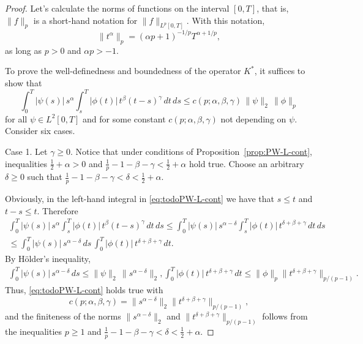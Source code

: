 \documentclass{article}
\theoremstyle{plain}
\theoremstyle{remark}
\theoremstyle{definition}
\begin{document}
\begin{proof} Let's calculate the norms of functions on the interval
	$[0,T]$,  that is, $\|f\|_p$ is a short-hand notation for
	$\|f\|_{L^p[0,T]}$.
	With this notation,
	$$\|t^\alpha\|_p = (\alpha p + 1)^{-1/p}T^{\alpha + 1/p},$$
	as long as $p>0$ and $\alpha p > -1$.

	To prove the well-definedness and boundedness of the operator $K^*$,
	it suffices to show that
	\begin{equation}
		\label{eq:todoPW-L-cont}
		\int_0^T |\psi(s)|\, s^\alpha
		\int_s^T |\phi(t)|\, t^\beta (t-s)^\gamma
		\, dt \, ds \le
		c(p;\alpha,\beta,\gamma) \, \|\psi\|_2 \, \|\phi\|_p
	\end{equation}
	for all $\psi\in L^2[0,T]$ and
	for some   constant  $c(p;\alpha,\beta,\gamma)$ not depending  on
	$\psi$.
Consider six cases.

Case 1. Let $\gamma\ge 0$.
	Notice that under conditions of Proposition~\ref{prop:PW-L-cont},
	inequalities
	$\frac12+\alpha>0$ and $\frac1p - 1 - \beta - \gamma < \frac12+\alpha$
	hold true.
	Choose an arbitrary $\delta\ge 0$ such that
	$\frac1p - 1 - \beta - \gamma < \delta < \frac12+\alpha$.

	Obviously, in the  left-hand integral  in \eqref{eq:todoPW-L-cont} we have that
	$s\mathbin{\le}t$ and $t-s\mathbin{\le} t$.
	Therefore
	\begin{equation*}\begin{gathered}
	    \int_0^T |\psi(s)|\, s^\alpha
		\int_s^T |\phi(t)|\, t^\beta (t-s)^\gamma
		\, dt \, ds
		\le  \int_0^T |\psi(s)|\, s^{\alpha-\delta}
			\int_s^T |\phi(t)|\, t^{\delta+\beta+\gamma}
			\, dt \, ds
			\\ \le
			\int_0^T |\psi(s)|\, s^{\alpha-\delta} \, ds \,
			\int_0^T |\phi(t)|\, t^{\delta+\beta+\gamma} \, dt .
		 \end{gathered}\end{equation*}
	By H\"older's inequality,
	\begin{gather*}
		\int_0^T |\psi(s)|\, s^{\alpha-\delta} \, ds \le
		\|\psi\|_2 \, \|s^{\alpha-\delta}\|_2,
		 \int_0^T |\phi(t)|\, t^{\delta+\beta+\gamma} \, dt \le
		\|\phi\|_p \|t^{\delta+\beta+\gamma}\|_{p/(p-1)} .
	\end{gather*}
	Thus, \eqref{eq:todoPW-L-cont} holds true with
	\[
		c(p;\alpha,\beta,\gamma) =
		\|s^{\alpha-\delta}\|_2
		\|t^{\delta+\beta+\gamma}\|_{p/(p-1)},
	\]
	and the finiteness
	of the norms $\|s^{\alpha-\delta}\|_2$ and
	$\|t^{\delta+\beta+\gamma}\|_{p/(p-1)}$
	follows from the inequalities $p\ge 1$ and
	$\frac1p - 1 - \beta - \gamma < \delta < \frac12+\alpha$.


\end{proof}
\end{document}
